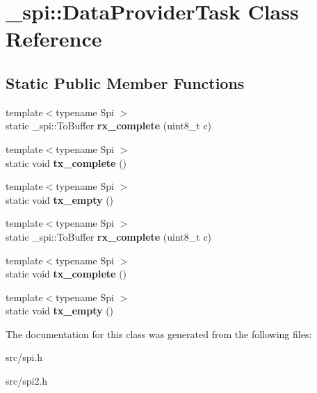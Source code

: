 \hypertarget{class__spi_1_1DataProviderTask}{}\section{\+\_\+spi\+:\+:Data\+Provider\+Task Class Reference}
\label{class__spi_1_1DataProviderTask}
\subsection*{Static Public Member Functions}
\begin{DoxyCompactItemize}
\item 
{\footnotesize template$<$typename Spi $>$ }\\static \+\_\+spi\+::\+To\+Buffer {\bfseries rx\+\_\+complete} (uint8\+\_\+t c)\hypertarget{class__spi_1_1DataProviderTask_a5f3759905dd157be3c7b42b1f77c160c}{}\label{class__spi_1_1DataProviderTask_a5f3759905dd157be3c7b42b1f77c160c}

\item 
{\footnotesize template$<$typename Spi $>$ }\\static void {\bfseries tx\+\_\+complete} ()\hypertarget{class__spi_1_1DataProviderTask_a3211b16d267b3e977ebf44e7158cca61}{}\label{class__spi_1_1DataProviderTask_a3211b16d267b3e977ebf44e7158cca61}

\item 
{\footnotesize template$<$typename Spi $>$ }\\static void {\bfseries tx\+\_\+empty} ()\hypertarget{class__spi_1_1DataProviderTask_ad9812d5db693664f54bcaee1152e4d6b}{}\label{class__spi_1_1DataProviderTask_ad9812d5db693664f54bcaee1152e4d6b}

\item 
{\footnotesize template$<$typename Spi $>$ }\\static \+\_\+spi\+::\+To\+Buffer {\bfseries rx\+\_\+complete} (uint8\+\_\+t c)\hypertarget{class__spi_1_1DataProviderTask_a5f3759905dd157be3c7b42b1f77c160c}{}\label{class__spi_1_1DataProviderTask_a5f3759905dd157be3c7b42b1f77c160c}

\item 
{\footnotesize template$<$typename Spi $>$ }\\static void {\bfseries tx\+\_\+complete} ()\hypertarget{class__spi_1_1DataProviderTask_a3211b16d267b3e977ebf44e7158cca61}{}\label{class__spi_1_1DataProviderTask_a3211b16d267b3e977ebf44e7158cca61}

\item 
{\footnotesize template$<$typename Spi $>$ }\\static void {\bfseries tx\+\_\+empty} ()\hypertarget{class__spi_1_1DataProviderTask_ad9812d5db693664f54bcaee1152e4d6b}{}\label{class__spi_1_1DataProviderTask_ad9812d5db693664f54bcaee1152e4d6b}

\end{DoxyCompactItemize}


The documentation for this class was generated from the following files\+:\begin{DoxyCompactItemize}
\item 
src/spi.\+h\item 
src/spi2.\+h\end{DoxyCompactItemize}
